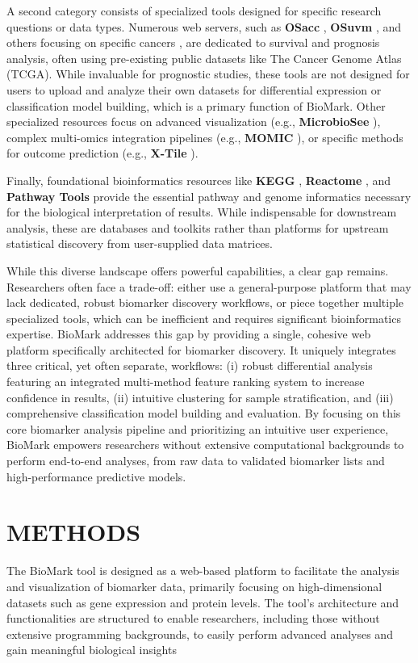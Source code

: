 \documentclass[journal]{IEEEtran}
\begin{document}
A second category consists of specialized tools designed for specific research questions or data types. Numerous web servers, such as \textbf{OSacc} \cite{OSacc_2019}, \textbf{OSuvm} \cite{OSuvm_2020}, and others focusing on specific cancers \cite{OSblca_2019, OSpaad_2020, OSlgg_2020, OSlihc_2020}, are dedicated to survival and prognosis analysis, often using pre-existing public datasets like The Cancer Genome Atlas (TCGA). While invaluable for prognostic studies, these tools are not designed for users to upload and analyze their own datasets for differential expression or classification model building, which is a primary function of BioMark. Other specialized resources focus on advanced visualization (e.g., \textbf{MicrobioSee} \cite{MicrobioSee_2022}), complex multi-omics integration pipelines (e.g., \textbf{MOMIC} \cite{MOMIC_2022}), or specific methods for outcome prediction (e.g., \textbf{X-Tile} \cite{Camp2004_XTile}).

Finally, foundational bioinformatics resources like \textbf{KEGG} \cite{KEGG_2017}, \textbf{Reactome} \cite{Reactome_2020}, and \textbf{Pathway Tools} \cite{PathwayTools_2009} provide the essential pathway and genome informatics necessary for the biological interpretation of results. While indispensable for downstream analysis, these are databases and toolkits rather than platforms for upstream statistical discovery from user-supplied data matrices.

While this diverse landscape offers powerful capabilities, a clear gap remains. Researchers often face a trade-off: either use a general-purpose platform that may lack dedicated, robust biomarker discovery workflows, or piece together multiple specialized tools, which can be inefficient and requires significant bioinformatics expertise. BioMark addresses this gap by providing a single, cohesive web platform specifically architected for biomarker discovery. It uniquely integrates three critical, yet often separate, workflows: (i) robust differential analysis featuring an integrated multi-method feature ranking system to increase confidence in results, (ii) intuitive clustering for sample stratification, and (iii) comprehensive classification model building and evaluation. By focusing on this core biomarker analysis pipeline and prioritizing an intuitive user experience, BioMark empowers researchers without extensive computational backgrounds to perform end-to-end analyses, from raw data to validated biomarker lists and high-performance predictive models.

\section{METHODS}
The BioMark tool is designed as a web-based platform to facilitate the analysis and visualization of biomarker data, primarily focusing on high-dimensional datasets such as gene expression and protein levels. The tool's architecture and functionalities are structured to enable researchers, including those without extensive programming backgrounds, to easily perform advanced analyses and gain meaningful biological insights
\end{document}
